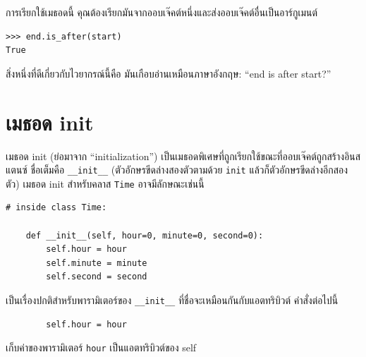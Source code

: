 การเรียกใช้เมธอดนี้ คุณต้องเรียกมันจากออบเจ๊คต์หนึ่งและส่งออบเจ๊คต์อื่นเป็นอาร์กูเมนต์

\begin{verbatim}
>>> end.is_after(start)
True
\end{verbatim}
%

สิ่งหนึ่งที่ดีเกี่ยวกับไวยากรณ์นี้คือ มันเกือบอ่านเหมือนภาษาอังกฤษ: ``end is after start?''


\section{เมธอด init} %


เมธอด init (ย่อมาจาก ``initialization'') เป็นเมธอดพิเศษที่ถูกเรียกใช้ขณะที่ออบเจ๊คต์ถูกสร้างอินสแตนซ์ 
ชื่อเต็มคือ \verb"__init__" (ตัวอักษรขีดล่างสองตัวตามด้วย {\tt init} แล้วก็ตัวอักษรขีดล่างอีกสองตัว)  เมธอด init สำหรับคลาส {\tt Time} อาจมีลักษณะเช่นนี้

\begin{verbatim}
# inside class Time:

    def __init__(self, hour=0, minute=0, second=0):
        self.hour = hour
        self.minute = minute
        self.second = second
\end{verbatim}
%

เป็นเรื่องปกติสำหรับพารามิเตอร์ของ \verb"__init__" ที่ชื่อจะเหมือนกันกับแอตทริบิวต์ คำสั่งต่อไปนี้

\begin{verbatim}
        self.hour = hour
\end{verbatim}
%

เก็บค่าของพารามิเตอร์ {\tt hour} เป็นแอตทริบิวต์ของ self 


